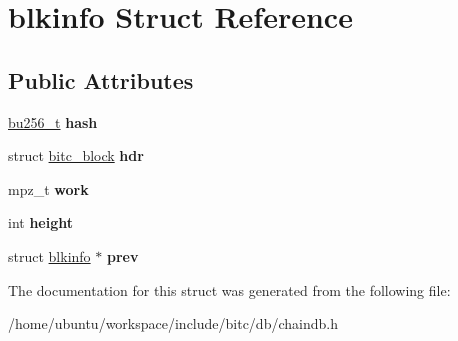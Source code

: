 \hypertarget{structblkinfo}{\section{blkinfo Struct Reference}
\label{structblkinfo}
}
\subsection*{Public Attributes}
\begin{DoxyCompactItemize}
\item 
\hypertarget{structblkinfo_acb979659f0946d2f6b89512f7b112e83}{\hyperlink{structbu256}{bu256\-\_\-t} {\bfseries hash}}\label{structblkinfo_acb979659f0946d2f6b89512f7b112e83}

\item 
\hypertarget{structblkinfo_ae323509169e136e40c53d9298d13818d}{struct \hyperlink{structbitc__block}{bitc\-\_\-block} {\bfseries hdr}}\label{structblkinfo_ae323509169e136e40c53d9298d13818d}

\item 
\hypertarget{structblkinfo_ac7b3f6aa68e8b3230fc1061e056b643f}{mpz\-\_\-t {\bfseries work}}\label{structblkinfo_ac7b3f6aa68e8b3230fc1061e056b643f}

\item 
\hypertarget{structblkinfo_a342e96e895940f919b7488d55d75d555}{int {\bfseries height}}\label{structblkinfo_a342e96e895940f919b7488d55d75d555}

\item 
\hypertarget{structblkinfo_a2b1d04caa863f80fec9ceb46517cae30}{struct \hyperlink{structblkinfo}{blkinfo} $\ast$ {\bfseries prev}}\label{structblkinfo_a2b1d04caa863f80fec9ceb46517cae30}

\end{DoxyCompactItemize}


The documentation for this struct was generated from the following file\-:\begin{DoxyCompactItemize}
\item 
/home/ubuntu/workspace/include/bitc/db/chaindb.\-h\end{DoxyCompactItemize}
